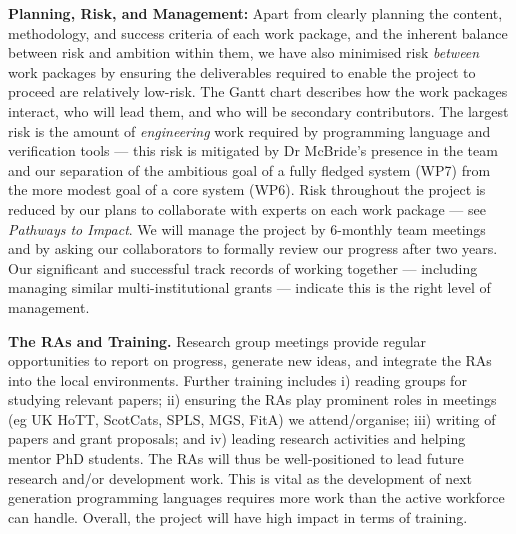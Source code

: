 \documentclass[a4paper,11pt]{article}
\begin{document}
{\bf Planning, Risk, and Management:} Apart from clearly
planning the content, methodology, and success criteria of each work package,
and the inherent balance between risk and ambition
within them, we have also minimised risk {\em between} work packages
by ensuring the deliverables required to enable the project to proceed 
are relatively low-risk. The Gantt chart describes how the work
packages interact, who will lead them, and who will be secondary
contributors. The largest risk is the 
amount of {\em engineering} work required by programming language
and verification tools --- this risk is mitigated by Dr McBride's
presence in the team and our 
separation of the ambitious
goal of a fully fledged system (WP7) from the more modest
goal of a core system (WP6). Risk throughout the project is reduced by
our plans to collaborate
with experts on each work package --- see {\em Pathways to Impact}. We
will manage the project by 6-monthly team meetings and by asking our
collaborators to formally review our progress after two years.  Our
significant and successful track records of working together ---
including managing similar multi-institutional grants --- indicate
this is the right level of management.


{\bf The RAs and Training.} Research group meetings provide regular opportunities to report on
progress, generate new ideas, and integrate the
RAs into the local environments. Further training includes i)
reading groups for studying relevant papers; ii) ensuring the RAs play
prominent roles in meetings (eg UK HoTT, ScotCats, SPLS, MGS, FitA) we
attend/organise; iii) writing of papers and grant proposals; and iv)
leading research activities and helping mentor PhD students.  The RAs
will thus be well-positioned to lead future research and/or
development work. This is vital as the development of next generation
programming languages requires more work than the active workforce can
handle. Overall, the project will have high impact in terms
of training.






\begin{footnotesize}
\begin{multicols}{2}

%
%

\end{multicols}
\end{footnotesize}

% 
% 
\end{document}
